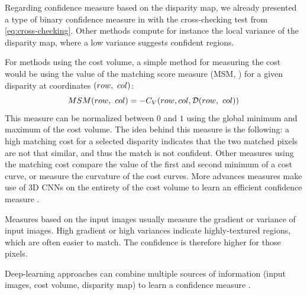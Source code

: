 \begin{example}\label{ex:confidence_measure}
    Regarding confidence measure based on the disparity map, we already presented a type of binary confidence measure in  with the cross-checking test from \cref{eq:cross-checking}. Other methods compute for instance the local variance of the disparity map, where a low variance suggests confident regions.
    
    For methods using the cost volume, a simple method for measuring the cost would be using the value of the matching score measure (MSM, \cite{egnal_stereo_2004}) for a given disparity at coordinates $(row, ~col)$:
    \begin{equation}
        MSM(row, ~col) = -C_V(row, col, \mathcal{D}(row, ~col))
    \end{equation}
    This measure can be normalized between $0$ and $1$ using the global minimum and maximum of the cost volume. The idea behind this measure is the following: a high matching cost for a selected disparity indicates that the two matched pixels are not that similar, and thus the match is not confident. Other measures using the matching cost compare the value of the first and second minimum of a cost curve, or measure the curvature of the cost curves. More advances measures make use of 3D CNNs on the entirety of the cost volume to learn an efficient confidence measure \cite{mehltretter_cnn-based_2019}.
    
    Measures based on the input images usually measure the gradient \cite{haeusler_ensemble_2013} or variance \cite{park_learning_2019} of input images. High gradient or high variances indicate highly-textured regions, which are often easier to match. The confidence is therefore higher for those pixels. 
    
    Deep-learning approaches can combine multiple sources of information (input images, cost volume, disparity map) to learn a confidence measure \cite{tosi_beyond_2018, kim_adversarial_2020}.
\end{example}


